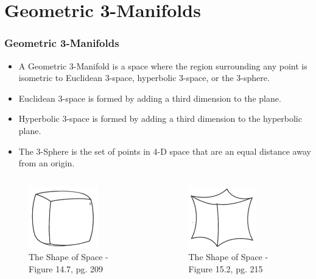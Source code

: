 \documentclass[13pt]{beamer}
\begin{document}
\section{Geometric 3-Manifolds} %
\begin{frame}
\frametitle{Geometric 3-Manifolds}
  \begin{itemize}
    \item A \alert{Geometric 3-Manifold} is a space where the region surrounding any point is isometric to Euclidean 3-space, hyperbolic 3-space, or the 3-sphere.
    \item \alert{Euclidean 3-space} is formed by adding a third dimension to the plane.
    \item \alert{Hyperbolic 3-space} is formed by adding a third dimension to the hyperbolic plane.
    \item \alert{The 3-Sphere} is the set of points in 4-D space that are an equal distance away from an origin.
  \end{itemize}
  \begin{columns}[r] %
     \centering
      \begin{figure}
        \includegraphics[height=2.70cm]{./img/cube3sphere}
        \caption{The Shape of Space - Figure 14.7, pg. 209}
      \end{figure}
     \centering
      \begin{figure}
        \includegraphics[height=2.70cm]{./img/cubeH3}
        \caption{The Shape of Space - Figure 15.2, pg. 215}
      \end{figure}
  \end{columns}
\end{frame}
\end{document}
